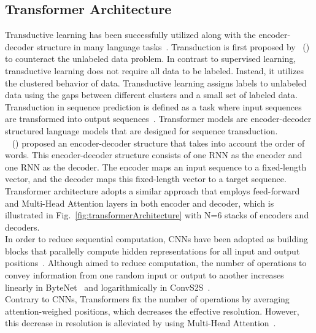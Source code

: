 \subsection{Transformer Architecture}
\label{subsec:newsContentModels_TransformerArch}
Transductive learning has been successfully utilized along with the encoder-decoder structure in many language
tasks~\parencite{S2SLearningWithNNs_Sutskever, LearningPhraseRepresentations_Cho, AttentionIsAllYouNeed_Vaswani}. Transduction is first proposed by~\citeauthor{LearningByTransduction_Gammerman} (\citeyear{LearningByTransduction_Gammerman}) to counteract the unlabeled data problem. In contrast to supervised learning, transductive learning does not require all data to be labeled. Instead, it utilizes the clustered behavior of data. Transductive learning assigns labels to unlabeled data using the gaps between different clusters and a small set of labeled data. Transduction in sequence prediction is defined as a task where input sequences are transformed into output sequences~\parencite{SequenceTransdutionWithRNNs_Graves}. Transformer models are encoder-decoder structured language models that are designed for sequence transduction.\\
~\citeauthor{LearningPhraseRepresentations_Cho} (\citeyear{LearningPhraseRepresentations_Cho}) proposed an encoder-decoder structure that takes into account the order of words. This encoder-decoder structure consists of one RNN as the encoder and one RNN as the decoder. The encoder maps an input sequence to a fixed-length vector, and the decoder maps this fixed-length vector to a target sequence. Transformer architecture adopts a similar approach that employs feed-forward and Multi-Head Attention layers in both encoder and decoder, which is illustrated in Fig.~\ref{fig:transformerArchitecture} with N=6 stacks of encoders and decoders.\\
In order to reduce sequential computation, CNNs have been adopted as building blocks that parallelly compute hidden representations for all input and output positions~\parencite{AttentionIsAllYouNeed_Vaswani}. Although aimed to reduce computation, the number of operations to convey information from one random input or output to another increases linearly in ByteNet~\parencite{ByteNet_Kalchbrenner} and logarithmically in ConvS2S~\parencite{ConvS2S_Gehring}.\\
Contrary to CNNs, Transformers fix the number of operations by averaging attention-weighed positions, which decreases the effective resolution. However, this decrease in resolution is alleviated by using Multi-Head Attention~\parencite{AttentionIsAllYouNeed_Vaswani}.
